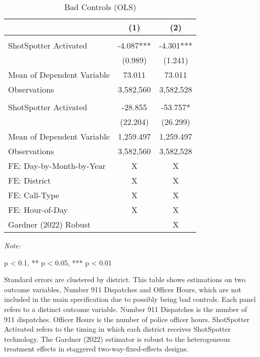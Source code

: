 \begin{table}[H]

\caption{\label{bad_controls}Bad Controls (OLS)}
\centering
\begin{threeparttable}
\fontsize{11}{13}\selectfont
\begin{tabular}[t]{lcc}
\toprule
  & (1) & (2)\\
\midrule
\addlinespace[0.3em]
\multicolumn{3}{l}{\textit{Panel A: Number 911 Dispatches}}\\
\hspace{1em}ShotSpotter Activated & -4.087*** & -4.301***\\
\hspace{1em} & (0.989) & (1.241)\\
\hspace{1em}Mean of Dependent Variable & 73.011 & 73.011\\
\hspace{1em}Observations & 3,582,560 & \vphantom{1} 3,582,528\\
\addlinespace[0.3em]
\multicolumn{3}{l}{\textit{Panel B: Officer Hours}}\\
\hspace{1em}ShotSpotter Activated & -28.855 & -53.757*\\
\hspace{1em} & (22.204) & (26.299)\\
\hspace{1em}Mean of Dependent Variable & 1,259.497 & 1,259.497\\
\hspace{1em}Observations & 3,582,560 & 3,582,528\\
\midrule
FE: Day-by-Month-by-Year & X & X\\
FE: District & X & X\\
FE: Call-Type & X & X\\
FE: Hour-of-Day & X & X\\
Gardner (2022) Robust &  & X\\
\bottomrule
\end{tabular}
\begin{tablenotes}
\item \textit{Note: } 
\item * p < 0.1, ** p < 0.05, *** p < 0.01
\item Standard errors are clustered by district.                      This table shows estimations on two outcome variables,                       Number 911 Dispatches and Officer Hours, which are not                      included in the main specification due to possibly being                      bad controls.                      Each panel refers to a distinct outcome variable.                  Number 911 Dispatches is the number of 911 dispatches.                  Officer Hours is the number of police officer hours.                  ShotSpotter Activated refers to the                  timing in which each district receives ShotSpotter technology. The                  Gardner (2022) estimator is robust to the heterogeneous                  treatment effects in staggered two-way-fixed-effects designs.
\end{tablenotes}
\end{threeparttable}
\end{table}
